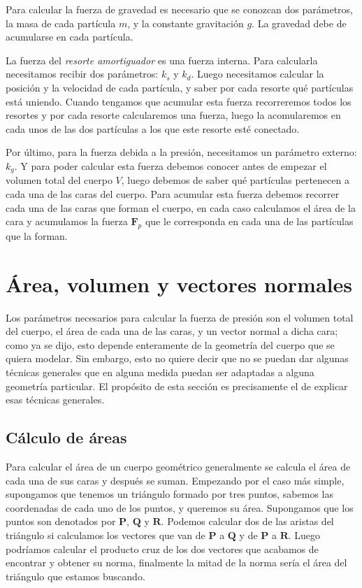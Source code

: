 Para calcular la fuerza de gravedad es necesario que se conozcan dos parámetros, la masa de cada partícula $m$, y la constante gravitación $g$.
La gravedad debe de acumularse en cada partícula.

La fuerza del \emph{resorte amortiguador} es una fuerza interna.
Para calcularla  necesitamos recibir dos parámetros: $k_s$ y $k_d$.
Luego necesitamos calcular la posición y la velocidad de cada partícula, y saber por cada resorte qué partículas está uniendo.
Cuando tengamos que acumular esta fuerza recorreremos todos los resortes y por cada resorte calcularemos una fuerza, luego la acomularemos en cada unos de las dos partículas a los que este resorte esté conectado.

Por último, para la fuerza debida a la presión, necesitamos un parámetro externo: $k_g$.
Y para poder calcular esta fuerza debemos conocer antes de empezar el volumen total del cuerpo $V$, luego debemos de saber qué partículas pertenecen a cada una de las caras del cuerpo.
Para acumular esta fuerza debemos recorrer cada una de las caras que forman el cuerpo, en cada caso calculamos el área de la cara y acumulamos la fuerza $\textbf{F}_p$ que le corresponda en cada una de las partículas que la forman.

\section{Área, volumen y vectores normales}
Los parámetros necesarios para calcular la fuerza de presión son el volumen total del cuerpo, el área de cada una de las caras, y un vector normal a dicha cara; como ya se dijo, esto depende enteramente de la geometría del cuerpo que se quiera modelar.
Sin embargo, esto no quiere decir que no se puedan dar algunas técnicas generales que en alguna medida puedan ser adaptadas a alguna geometría particular.
El propósito de esta sección es precisamente el de explicar esas técnicas generales.

\subsection{Cálculo de áreas}
Para calcular el área de un cuerpo geométrico generalmente se calcula el área de cada una de sus caras y después se suman.
Empezando por el caso más simple, supongamos que tenemos un triángulo formado por tres puntos, sabemos las coordenadas de cada uno de los puntos, y queremos su área.
Supongamos que los puntos son denotados por $\textbf{P}$, $\textbf{Q}$ y $\textbf{R}$.
Podemos calcular dos de las aristas del triángulo si calculamos los vectores que van de $\textbf{P}$ a $\textbf{Q}$ y de $\textbf{P}$ a $\textbf{R}$.
Luego podríamos calcular el producto cruz de los dos vectores que acabamos de encontrar y obtener su norma, finalmente la mitad de la norma sería el área del triángulo que estamos buscando.

